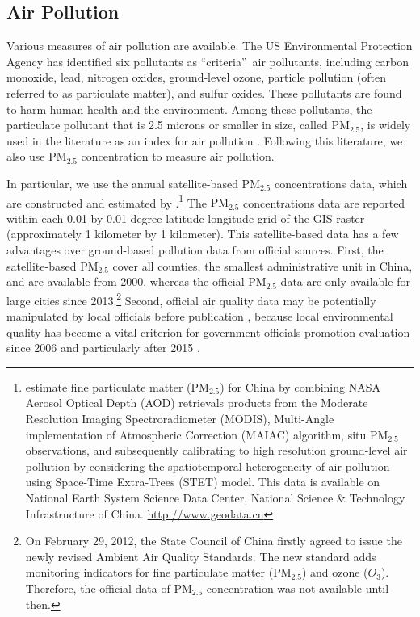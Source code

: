 \documentclass[12pt]{article}
\begin{document}
  \subsection{Air Pollution}
  \label{sec:3.1} 
  Various measures of air pollution are available. The US Environmental Protection Agency has
  identified six pollutants as \textquotedblleft criteria\textquotedblright\
  air pollutants, including carbon monoxide, lead, nitrogen oxides,
  ground-level ozone, particle pollution (often referred to as particulate
  matter), and sulfur oxides. These pollutants are found to harm human health
  and the environment. Among these pollutants, the particulate pollutant that
  is 2.5 microns or smaller in size, called $\mathrm{PM_{2.5}}$, is widely used in
  the literature as an index for air pollution %
  \citep[e.g.,][]{chang2016particulate,fu2021air}. Following this literature, we also
  use $\mathrm{PM_{2.5}}$ concentration to measure air pollution.
  
  In particular, we use the annual satellite-based $\mathrm{PM_{2.5}}$ concentrations data, which are constructed
  and estimated by \cite{wei2021reconstructing}.\footnote{ \cite{wei2021reconstructing}
  estimate fine particulate matter ($\mathrm{PM_{2.5}}$) for China by
  combining NASA Aerosol Optical Depth (AOD) retrievals products from the Moderate Resolution Imaging Spectroradiometer (MODIS), 
  Multi-Angle implementation of Atmospheric Correction (MAIAC) algorithm, situ $\mathrm{PM_{2.5}}$ observations, and
  subsequently calibrating to high resolution ground-level air pollution by considering the spatiotemporal heterogeneity 
  of air pollution using Space-Time Extra-Trees (STET) model. This data is available on National Earth System Science Data Center,
  National Science \& Technology Infrastructure of China. \url{http://www.geodata.cn}} The $\mathrm{PM_{2.5}}$ concentrations data are reported within each 0.01-by-0.01-degree
  latitude-longitude grid of the GIS raster (approximately 1 kilometer by
  1 kilometer). This satellite-based data has a few advantages over ground-based pollution data from official sources. First, the satellite-based $\mathrm{PM_{2.5}}$ cover all counties, the smallest
  administrative unit in China, and are available from 2000, whereas the
  official $\mathrm{PM_{2.5}}$ data are only available for large cities since
  2013.\footnote{%
  On February 29, 2012, the State Council of China firstly agreed to issue the
  newly revised Ambient Air Quality Standards. The new standard adds
  monitoring indicators for fine particulate matter ($\mathrm{PM_{2.5}}$) and
  ozone ($O_{3}$). Therefore, the official data of $\mathrm{PM_{2.5}}$
  concentration was not available until then.} Second, official air quality
  data may be potentially manipulated by local officials before publication %
  \citep{ghanem2014effortless,andrews2008inconsistencies}, because local
  environmental quality has become a vital criterion for government officials
  promotion evaluation since 2006 and particularly
  after 2015 \citep{fan2022unintended}.
  
\end{document}
